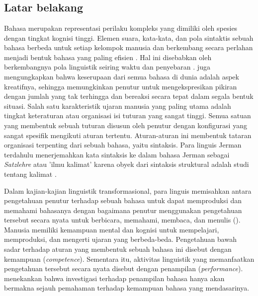 

\chapter{\babSatu}

\section{Latar belakang}
Bahasa merupakan representasi perilaku kompleks yang dimiliki oleh spesies dengan tingkat kognisi tinggi. Elemen suara, kata-kata, dan pola sintaktis sebuah bahasa berbeda untuk setiap kelompok manusia dan berkembang secara perlahan menjadi bentuk bahasa yang paling efisien \citep{aitchison2004change}. Hal ini disebabkan oleh berkembangnya pola linguistik seiring waktu dan penyebaran \citep{sapir1921intro}. \cite{chomsky1965syntactic} juga mengungkapkan bahwa keserupaan dari semua bahasa di dunia adalah aspek kreatifnya, sehingga memungkinkan penutur untuk mengekspresikan pikiran dengan jumlah yang tak terhingga dan bereaksi secara tepat dalam segala bentuk situasi. Salah satu karakteristik ujaran manusia yang paling utama adalah tingkat keteraturan atau organisasi isi tuturan yang sangat tinggi. Semua satuan yang membentuk sebuah tuturan disusun oleh penutur dengan konfigurasi yang sangat spesifik mengikuti aturan tertentu. Aturan-aturan ini membentuk tataran organisasi terpenting dari sebuah bahasa, yaitu sintaksis. Para linguis Jerman terdahulu menerjemahkan kata sintaksis ke dalam bahasa Jerman sebagai \textit{Satzlehre} atau 'ilmu kalimat' karena obyek dari sintaksis struktural adalah studi tentang kalimat \citep{tesniere1959elements}.

Dalam kajian-kajian linguistik transformasional, para linguis memisahkan antara pengetahuan penutur terhadap sebuah bahasa untuk dapat memproduksi dan memahami bahasanya dengan bagaimana penutur menggunakan pengetahuan tersebut secara nyata untuk berbicara, memahami, membaca, dan menulis (\citealp{chomsky1965syntactic,delahuntygarvey2010soundsense}). Manusia memiliki kemampuan mental dan kognisi untuk mempelajari, memproduksi, dan mengerti ujaran yang berbeda-beda. Pengetahuan bawah sadar terhadap aturan yang membentuk sebuah bahasa ini disebut dengan kemampuan (\textit{competence}). Sementara itu, aktivitas linguistik yang memanfaatkan pengetahuan tersebut secara nyata disebut dengan penampilan (\textit{performance}). \cite{chomsky1965syntactic} menekankan bahwa investigasi terhadap penampilan bahasa hanya akan bermakna sejauh pemahaman terhadap kemampuan bahasa yang mendasarinya.

